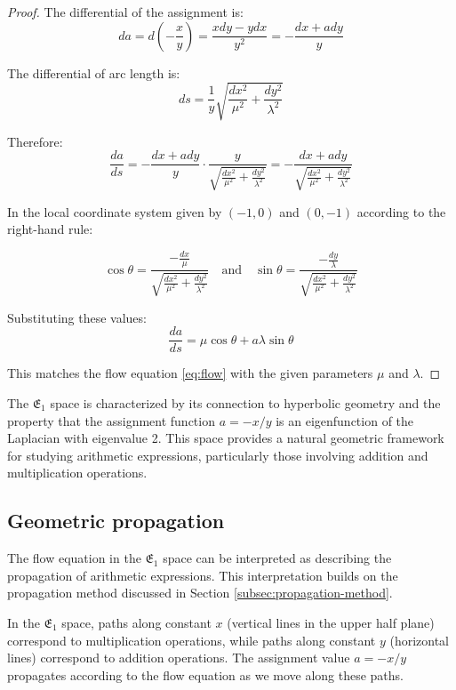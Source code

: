 \begin{proof}
The differential of the assignment is:
$$
da = d\left(-\frac{x}{y}\right) = \frac{xdy - ydx}{y^2} = -\frac{dx + a dy}{y}
$$

The differential of arc length is:
$$
ds = \frac{1}{y}\sqrt{\frac{dx^2}{\mu^2} + \frac{dy^2}{\lambda^2}}
$$

Therefore:
$$
\frac{da}{ds} = - \frac{dx + a dy}{y} \cdot \frac{y}{\sqrt{\frac{dx^2}{\mu^2} + \frac{dy^2}{\lambda^2}}} = -\frac{dx + a dy}{\sqrt{\frac{dx^2}{\mu^2} + \frac{dy^2}{\lambda^2}}}
$$

In the local coordinate system given by $(-1, 0)$ and $(0, -1)$ according to the right-hand rule:

$$
\cos \theta = \frac{-\frac{dx}{\mu}}{\sqrt{\frac{dx^2}{\mu^2} + \frac{dy^2}{\lambda^2}}} \quad \text{and} \quad \sin \theta = \frac{-\frac{dy}{\lambda}}{\sqrt{\frac{dx^2}{\mu^2} + \frac{dy^2}{\lambda^2}}}
$$

Substituting these values:
$$
\frac{da}{ds} = \mu \cos \theta + a \lambda \sin \theta
$$

This matches the flow equation \eqref{eq:flow} with the given parameters $\mu$ and $\lambda$.
\end{proof}

The $\mathfrak{E}_1$ space is characterized by its connection to hyperbolic geometry and the property that the assignment function $a = -x/y$ is an eigenfunction of the Laplacian with eigenvalue 2. This space provides a natural geometric framework for studying arithmetic expressions, particularly those involving addition and multiplication operations.

\subsection{Geometric propagation}\label{subsec:geompropagation}

The flow equation in the $\mathfrak{E}_1$ space can be interpreted as describing the propagation of arithmetic expressions. This interpretation builds on the propagation method discussed in Section \ref{subsec:propagation-method}.

In the $\mathfrak{E}_1$ space, paths along constant $x$ (vertical lines in the upper half plane) correspond to multiplication operations, while paths along constant $y$ (horizontal lines) correspond to addition operations. The assignment value $a = -x/y$ propagates according to the flow equation as we move along these paths.

